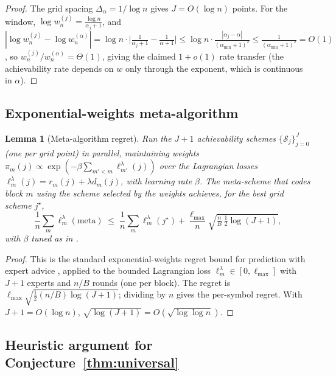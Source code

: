 \documentclass[11pt]{article}
\theoremstyle{plain}
\newtheorem{lemma}[theorem]{Lemma}
\theoremstyle{definition}
\theoremstyle{remark}
\begin{document}
\begin{proof}
The grid spacing $\Delta_\alpha = 1/\log n$ gives
$J = O(\log n)$ points. For the window,
$\log w_n^{(j)} = \frac{\log n}{\alpha_j + 1}$, and
$|\log w_n^{(j)} - \log w_n^{(\alpha)}|
= \log n \cdot \bigl|\frac{1}{\alpha_j+1} -
\frac{1}{\alpha+1}\bigr|
\leq \log n \cdot \frac{|\alpha_j - \alpha|}{(\alpha_{\min}+1)^2}
\leq \frac{1}{(\alpha_{\min}+1)^2} = O(1)$,
so $w_n^{(j)}/w_n^{(\alpha)} = \Theta(1)$, giving the claimed
$1+o(1)$ rate transfer (the achievability rate depends on $w$ only
through the exponent, which is continuous in $\alpha$).
\end{proof}

\subsection{Exponential-weights meta-algorithm}

\begin{lemma}[Meta-algorithm regret]\label{lem:exp-weights}
Run the $J+1$ achievability schemes
$\{\mathcal{S}_j\}_{j=0}^{J}$ (one per grid point) in parallel,
maintaining weights $\pi_m(j) \propto
\exp(-\beta \sum_{m' < m} \ell_{m'}^\lambda(j))$ over the
Lagrangian losses $\ell_m^\lambda(j) = r_m(j) + \lambda d_m(j)$,
with learning rate $\beta$. The meta-scheme that codes block $m$
using the scheme selected by the weights achieves, for the best
grid scheme $j^\star$,
\[
\frac{1}{n}\sum_m \ell_m^\lambda(\text{meta})
\;\leq\;
\frac{1}{n}\sum_m \ell_m^\lambda(j^\star)
   + \frac{\ell_{\max}}{n}\sqrt{\tfrac{n}{B}\,\tfrac{1}{2}\log(J+1)},
\]
with $\beta$ tuned as in \citep[Theorem~2.2]{cesabianchi2006prediction}.
\end{lemma}

\begin{proof}
This is the standard exponential-weights regret bound for
prediction with expert advice
\citep[Ch.~2]{cesabianchi2006prediction}, applied to the bounded
Lagrangian loss $\ell_m^\lambda \in [0, \ell_{\max}]$ with
$J+1$ experts and $n/B$ rounds (one per block). The regret is
$\ell_{\max}\sqrt{\tfrac{1}{2}(n/B)\log(J+1)}$; dividing by $n$
gives the per-symbol regret. With $J+1 = O(\log n)$,
$\sqrt{\log(J+1)} = O(\sqrt{\log\log n})$.
\end{proof}

\subsection{Heuristic argument for Conjecture~\ref{thm:universal}}
\end{document}
